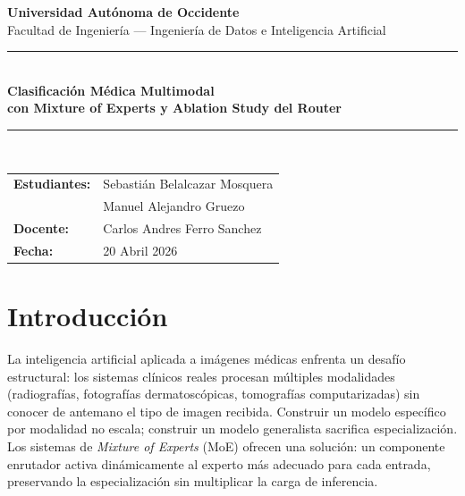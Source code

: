 \documentclass[11pt, a4paper]{article}
\begin{document}

\begin{titlepage}
\centering
\vspace*{1cm}
{\large \textbf{Universidad Autónoma de Occidente}}\\[0.3cm]
{\normalsize Facultad de Ingeniería — Ingeniería de Datos e Inteligencia Artificial}\\[0.3cm]

\rule{\linewidth}{1pt}\\[0.4cm]
{\LARGE \textbf{Clasificación Médica Multimodal}}\\[0.2cm]
{\Large \textbf{con Mixture of Experts y Ablation Study del Router}}\\[0.4cm]
\rule{\linewidth}{1pt}\\[1.5cm]

{\normalsize
\begin{tabular}{ll}
\textbf{Estudiantes:} & Sebastián Belalcazar Mosquera \\
                      & Manuel Alejandro Gruezo \\[0.4cm]
\textbf{Docente:}     & Carlos Andres Ferro Sanchez \\[0.4cm]
\textbf{Fecha:}       & 20 Abril 2026 \\
\end{tabular}
}

\vfill

\end{titlepage}

\setcounter{page}{1}

\section{Introducción}

La inteligencia artificial aplicada a imágenes médicas enfrenta un desafío
estructural: los sistemas clínicos reales procesan múltiples modalidades
(radiografías, fotografías dermatoscópicas, tomografías computarizadas) sin
conocer de antemano el tipo de imagen recibida. Construir un modelo específico
por modalidad no escala; construir un modelo generalista sacrifica
especialización. Los sistemas de \textit{Mixture of Experts} (MoE) ofrecen
una solución: un componente enrutador activa dinámicamente al experto más
adecuado para cada entrada, preservando la especialización sin multiplicar
la carga de inferencia.
\end{document}
